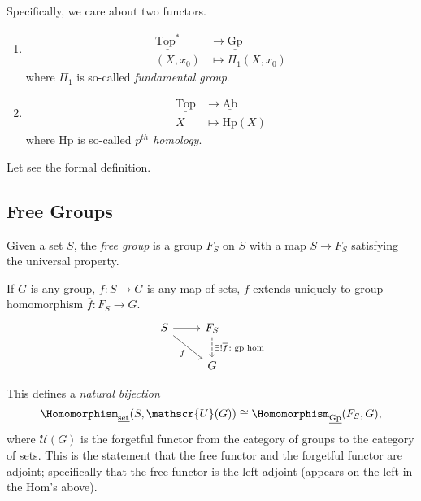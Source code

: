 \hr

Specifically, we care about two functors.
\begin{enumerate}
	\item
	      \[
		      \begin{split}
			      \underline{\mathrm{Top}^*} &\to \underline{\mathrm{Gp}} \\
			      (X, x_0)&\mapsto \Pi_1(X, x_0)
		      \end{split}
	      \]
	      where \(\Pi _1\) is so-called \emph{fundamental group}.
	\item
	      \[
		      \begin{split}
			      \underline{\mathrm{Top}} &\to \underline{\mathrm{Ab}} \\
			      X&\mapsto \mathrm{Hp}(X)
		      \end{split}
	      \]
	      where \(\mathrm{Hp} \) is so-called \emph{\(p^{th}\) homology}.
\end{enumerate}

Let see the formal definition.

\subsection{Free Groups}
\begin{definition}\label{def:free-group}
	Given a set \(S\), the \emph{free group} is a group \(F_S\) on \(S\) with a map \(S\to F_S\) satisfying the
	universal property.

	If \(G\) is any group, \(f\colon S\to G\) is any map of sets, \(f\) extends uniquely to group homomorphism \(\overline{f} \colon F_S \to G\).
	\[
		\begin{tikzcd}
			S \ar[rd, "f"']\ar[r, ] & F_S\ar[d, dashed, "\exists ! \overline{f} \colon \text{gp hom} "]\\
			& G
		\end{tikzcd}
	\]
\end{definition}
\begin{note}
	This defines a \emph{natural bijection}
	\[
		\Homomorphism_{\underline{\mathrm{set}}}(S, \mathscr{U}(G))\cong \Homomorphism_{\underline{\mathrm{Gp}}}(F_S, G),
	\]
	where \(\mathscr{U} (G)\) is the forgetful functor from the category of groups to the category of sets. This is the
	statement that the free functor and the forgetful functor are \hyperref[def:adjoint-functor]{adjoint};
	specifically that the free functor is the left adjoint (appears on the left in the Hom's above).
\end{note}

